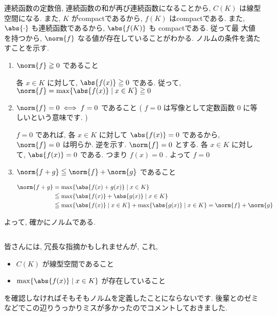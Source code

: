 \begin{tproof}
    連続函数の定数倍, 連続函数の和が再び連続函数になることから, $C ( K )$ は線型空間になる. また, $K$ がcompactであるから, $f ( K )$ はcompactである. また, $\abs{ \cdot }$ も連続函数であるから, $\abs{ f ( K ) }$ も compactである. 従って最
    大値を持つから, $\norm{ f }$ なる値が存在していることがわかる. ノルムの条件を満たすことを示す.
    \begin{enumerate}
        \item $\norm{ f } \geq 0$ であること

              \zw 各 $x \in K$ に対して, $\abs{f ( x ) } \geq 0$ である. 従って, $\norm{ f } = \max \{ \abs{ f ( x )} \mid x \in K \} \geq 0$

        \item $\norm{ f } = 0 \iff  f = 0$ であること ( $f = 0$ は写像として定数函数 $0$ に等しいという意味です. )

              $f = 0$ であれば, 各 $x \in K$ に対して $\abs{ f ( x ) } = 0$ であるから, $\norm{ f } = 0$ は明らか. 逆を示す. $\norm{ f } = 0$ とする. 各 $x \in K$ に対して, $\abs{ f ( x ) } = 0$ である. つまり $f ( x ) = 0$ . よって $f = 0$

        \item $\norm{ f + g } \leq \norm{ f } + \norm{ g }$ であること

              \begin{align*}
                  \norm{ f + g } & =  \max \{ \abs{ f ( x ) + g ( x )} \mid x \in K \}                                                                   \\
                                 & \leq  \max \{ \abs{ f ( x ) } + \abs{ g ( x ) } \mid x \in K \}                                                       \\
                                 & \leqq   \max \{ \abs{ f ( x ) }  \mid x \in K \} + \max \{ \abs{ g ( x ) }  \mid x \in K \} = \norm{ f } + \norm{ g }
              \end{align*}
    \end{enumerate}
    よって, 確かにノルムである.
\end{tproof}

\begin{column}
    皆さんには, 冗長な指摘かもしれませんが, これ,
    \begin{itemize}
        \item $C ( K )$ が線型空間であること
        \item $\max \{ \abs{ f ( x )} \mid x \in K \}$ が存在していること
    \end{itemize}
    を確認しなければそもそもノルムを定義したことにならないです. 後輩とのゼミなどでこの辺りうっかりミスが多かったのでコメントしておきました.
\end{column}



